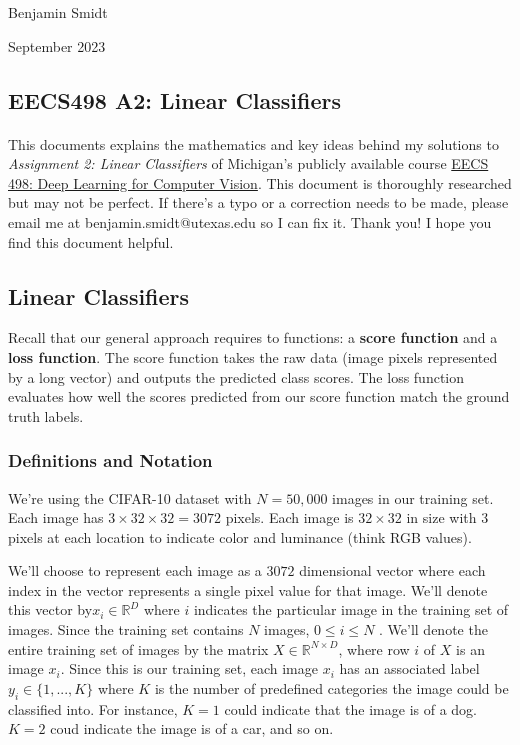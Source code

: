 \documentclass[12pt]{article}
\begin{document}
\noindent Benjamin Smidt

 September 2023
\begin{center}
\section*{EECS498 A2: Linear Classifiers}
\end{center}

\paragraph{} This documents explains the mathematics and key ideas behind my solutions 
to \emph{Assignment 2: Linear Classifiers} of Michigan's publicly available course 
\href{https://github.com/bensmidt/machine-learning/tree/main/eecs498}
{EECS 498: Deep Learning for Computer Vision}. This document is thoroughly researched 
but may not be perfect. If there's a typo or a correction needs to be made, please 
email me at benjamin.smidt@utexas.edu so I can fix it. Thank you! I hope you find this 
document helpful.

\tableofcontents{}

\newpage

\subsection*{Linear Classifiers}
Recall that our general approach requires to functions: a \textbf{score function} and a \textbf{loss function}. The score function takes the raw data (image pixels represented by a long vector) and outputs the predicted class scores. The loss function evaluates how well the scores predicted from our score function match the ground truth labels.

\subsubsection*{Definitions and Notation}
We're using the CIFAR-10 dataset with $N = 50,000$ images in our training set. Each image has $3 \times 32 \times 32 = 3072$ pixels. Each image is $32 \times 32$ in size with $3$ pixels at each location to indicate color and luminance (think RGB values). 

We'll choose to represent each image as a $3072$ dimensional vector where each index in the vector represents a single pixel value for that image. We'll denote this vector by$x_i \in \mathbb{R}^D$ where $i$ indicates the particular image in the training set of images. Since the training set contains $N$ images, $0 \le i \le N$ . We'll denote the entire training set of images by the matrix $X \in \mathbb{R}^{N \times D}$, where row $i$ of $X$ is an image $x_i$. Since this is our training set, each image $x_i$ has an associated label $y_i \in \{1, ..., K\}$ where $K$ is the number of predefined categories the image could be classified into. For instance, $K = 1$ could indicate that the image is of a dog. $K = 2$ coud indicate the image is of a car, and so on. 
\end{document}
